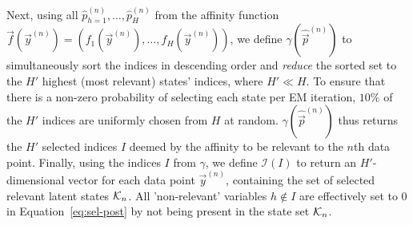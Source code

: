 %
Next, using all $\hat{p}_{h=1}^{(n)},\dots, \hat{p}_H^{(n)}$  
from the affinity function 
$\vec{f}(\vec{y}^{(n)}) = (f_1(\vec{y}^{(n)}), \dots, f_H(\vec{y}^{(n)}))$, we define 
 $\gamma(\hat{\vec{p}}^{(n)})$ to simultaneously sort the indices in descending order and \textit{reduce} the sorted set to the $H'$ highest (most relevant) states' indices, where $H' \ll H$.
To ensure that there is a non-zero probability of selecting each state per EM iteration, $10\%$ of the $H'$ indices are uniformly chosen from $H$ at random.
$\gamma(\hat{\vec{p}}^{(n)})$ thus returns the $H'$ selected indices $I$ deemed by the affinity to be relevant to the $n$th data point.
%
%
%
Finally, using the indices $I$ from $\gamma$, we define $\mathcal{I}(I)$ to return an $H'$-dimensional vector for each data point $\vec{y}^{(n)}$, containing the set of selected relevant latent states $\mathcal{K}_{n}$. 
All 'non-relevant' variables $h\not\in I$ are effectively set to $0$ in Equation~\eqref{eq:sel-post} 
by not being present in the state set $\mathcal{K}_{n}$.
%
%

